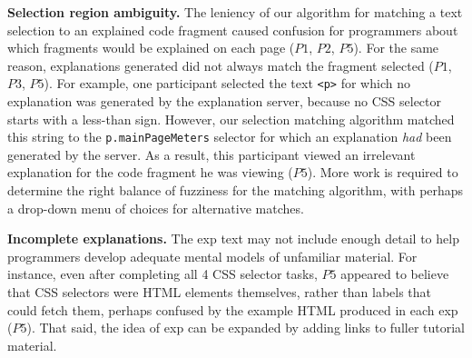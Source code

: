{\bf Selection region ambiguity.}
The leniency of our algorithm for matching a text selection to an explained code fragment caused confusion for programmers about which fragments would be explained on each page ($P1$, $P2$, $P5$).
For the same reason, explanations generated did not always match the fragment selected ($P1$, $P3$, $P5$).
For example, one participant selected the text \texttt{<p>} for which no explanation was generated by the explanation server, because no CSS selector starts with a less-than sign.
However, our selection matching algorithm matched this string to the \texttt{p.mainPageMeters} selector for which an explanation \emph{had} been generated by the server.  As a result, this participant viewed an irrelevant explanation for the code fragment he was viewing ($P5$).  More work is required to determine the right balance of fuzziness for the matching algorithm, with perhaps a drop-down menu of choices for alternative matches.

{\bf Incomplete explanations.} The  \gls{exp} text may not include enough detail to help programmers  develop adequate mental models of unfamiliar material. For instance,
even after completing all 4 CSS selector tasks, $P5$ appeared to believe that CSS selectors were HTML elements themselves, rather than labels that could fetch them, perhaps confused by the example HTML produced in each \gls{exp} ($P5$).  That said, the idea of \gls{exp} can be expanded by adding links to fuller tutorial material.
